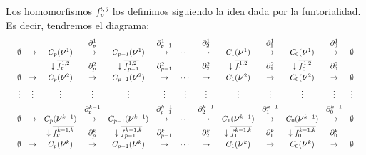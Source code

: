\documentclass[12pt, a4paper, twoside]{book}
\numberwithin{equation}{section}
\theoremstyle{definition}
\theoremstyle{remark}
\theoremstyle{plain}
\begin{document}
	Los homomorfismos $f_{p}^{i,j}$ los definimos siguiendo la idea dada
	por la funtorialidad. Es decir, tendremos el diagrama:
	\begin{equation*}
		\resizebox{\textwidth}{!}{$ 
		\begin{array}{ccccccccccccc}
			 & & & \partial_{p}^{1} &  & 
			\partial_{p-1}^{1} &  & \partial_{2}^{1}&  & 
			\partial_{1}^{1}&  & 
			\partial_{0}^{1} & \\ 
			\emptyset & \rightarrow & C_{p}(
			\text{{\Large $\nu$}$^{1}$}) & \rightarrow & C_{p-1}(
			\text{{\Large $\nu$}$^{1}$}) & \rightarrow &\cdots & 
			\rightarrow & C_{1}(
			\text{{\Large $\nu$}$^{1}$})& \rightarrow & C_{0}(
			\text{{\Large $\nu$}$^{1}$})& \rightarrow & 
			\emptyset\\[3pt]

			& & \downarrow \overline{f_{p}^{1,2}}& \partial_{p}^{2} & 
			\downarrow \overline{f_{p-1}^{1,2}}& \partial_{p-1}^{2} 
			& & \partial_{2}^{2} & \downarrow \overline{f_{1}^{1,2}}
			& \partial_{1}^{2} & \downarrow \overline{f_{0}^{1,2}} & 
			\partial_{0}^{2} & \\ [3pt]	
			\emptyset & \rightarrow & C_{p}(
			\text{{\Large $\nu$}$^{2}$}) & \rightarrow & C_{p-1}(
			\text{{\Large $\nu$}$^{2}$}) & \rightarrow &\cdots & 
			\rightarrow & C_{1}(
			\text{{\Large $\nu$}$^{2}$})& \rightarrow & C_{0}(
			\text{{\Large $\nu$}$^{2}$})& \rightarrow & 
			\emptyset \\[5pt]
			
			\vdots & \vdots & \vdots & \vdots & \vdots & \vdots & 
			\vdots & \vdots & \vdots & \vdots & \vdots & \vdots & 
			\vdots \\[5pt]
			
			& & & \partial_{p}^{k-1} &  & 
			\partial_{p-1}^{k-1} &  & \partial_{2}^{k-1}&  & 
			\partial_{1}^{k-1}&  & 
			\partial_{0}^{k-1} & \\ 
			\emptyset & \rightarrow & C_{p}(
			\text{{\Large $\nu$}$^{k-1}$}) & \rightarrow & C_{p-1}(
			\text{{\Large $\nu$}$^{k-1}$}) & \rightarrow &\cdots & 
			\rightarrow & C_{1}(
			\text{{\Large $\nu$}$^{k-1}$})& \rightarrow & C_{0}(
			\text{{\Large $\nu$}$^{k-1}$})& \rightarrow & 
			\emptyset\\[3pt]

			& & \downarrow \overline{f_{p}^{k-1,k}}& \partial_{p}^{k} & 
			\downarrow \overline{f_{p-1}^{k-1,k}}& \partial_{p-1}^{k} 
			& & \partial_{2}^{k} & \downarrow \overline{f_{1}^{k-1,k}}
			& \partial_{1}^{k} & \downarrow \overline{f_{0}^{k-1,k}} & 
			\partial_{0}^{k} & \\ [3pt]	
			\emptyset & \rightarrow & C_{p}(
			\text{{\Large $\nu$}$^{k}$}) & \rightarrow & C_{p-1}(
			\text{{\Large $\nu$}$^{k}$}) & \rightarrow &\cdots & 
			\rightarrow & C_{1}(
			\text{{\Large $\nu$}$^{k}$})& \rightarrow & C_{0}(
			\text{{\Large $\nu$}$^{k}$})& \rightarrow & \emptyset \\
		\end{array}$}
	\end{equation*}
\end{document}
